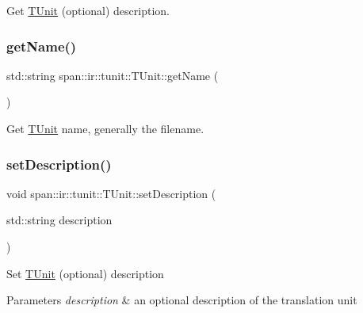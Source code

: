 Get \hyperlink{classspan_1_1ir_1_1tunit_1_1TUnit}{T\+Unit} (optional) description. 

\mbox{\label{classspan_1_1ir_1_1tunit_1_1TUnit_af45190bb51bff60767ba719482a80351}} 
\subsubsection{\texorpdfstring{get\+Name()}{getName()}}
{\footnotesize\ttfamily std\+::string span\+::ir\+::tunit\+::\+T\+Unit\+::get\+Name (\begin{DoxyParamCaption}{ }\end{DoxyParamCaption})}



Get \hyperlink{classspan_1_1ir_1_1tunit_1_1TUnit}{T\+Unit} name, generally the filename. 

\mbox{\label{classspan_1_1ir_1_1tunit_1_1TUnit_a74ebf1c50b498f8117a9fd9257ad501d}} 
\subsubsection{\texorpdfstring{set\+Description()}{setDescription()}}
{\footnotesize\ttfamily void span\+::ir\+::tunit\+::\+T\+Unit\+::set\+Description (\begin{DoxyParamCaption}\item[{std\+::string}]{description }\end{DoxyParamCaption})}

Set \hyperlink{classspan_1_1ir_1_1tunit_1_1TUnit}{T\+Unit} (optional) description 
\begin{DoxyParams}{Parameters}
{\em description} & an optional description of the translation unit \\
\hline
\end{DoxyParams}
\mbox{\label{classspan_1_1ir_1_1tunit_1_1TUnit_aafb230fac04e8d88606257223a21d198}} 
